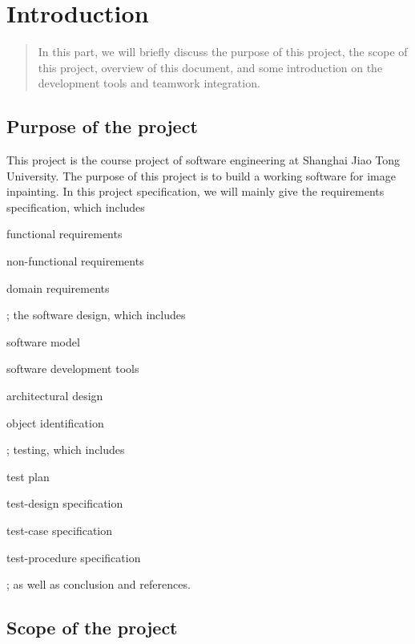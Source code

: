 \chapter{Introduction}

\begin{abstract}
    In this part, we will briefly discuss the purpose of this project,
    the scope of this project, overview of this document, and some
    introduction on the development tools and teamwork integration.
\end{abstract}


\section{Purpose of the project}
This project is the course project of software engineering at Shanghai
Jiao Tong University. The purpose of this project is to build a working
software for image inpainting. In this project specification, we will mainly
give the requirements specification, which includes 
\begin{enumerate*}
\item functional requirements
\item non-functional requirements
\item domain requirements
\end{enumerate*}; the software design, which includes 
\begin{enumerate*}
\item software model
\item software development tools
\item architectural design
\item object identification
\end{enumerate*}; testing, which includes
\begin{enumerate*}
\item test plan
\item test-design specification
\item test-case specification
\item test-procedure specification
\end{enumerate*}; as well as conclusion and references.


\section{Scope of the project}
